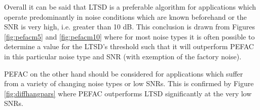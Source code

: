 Overall it can be said that LTSD is a preferable algorithm for applications which operate predominantly in noise conditions which are known beforehand or the SNR is very high, i.e. greater than 10 dB. This conclusion is drawn from Figures \ref{fig:pefacm5} and \ref{fig:pefacm10} where for most noise types it is often possible to determine a value for the LTSD's threshold such that it will outperform PEFAC in this particular noise type and SNR (with exemption of the factory noise).

PEFAC on the other hand should be considered for applications which suffer from a variety of changing noise types or low SNRs. This is confirmed by Figure \ref{fig:diffhangpars} where PEFAC outperforms LTSD significantly at the very low SNRs.